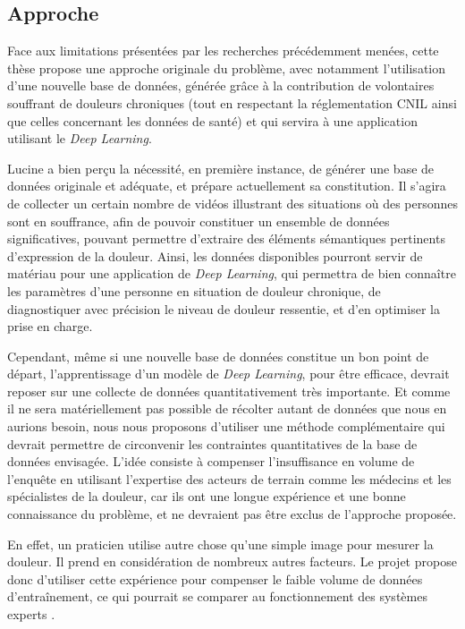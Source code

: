 \documentclass[french]{article}
\begin{document}
\subsection{Approche}
\label{sec:orgcad02fb}

Face aux limitations présentées par les recherches précédemment menées, cette
thèse propose une approche originale du problème, avec notamment l’utilisation
d’une nouvelle base de données, générée grâce à la contribution de volontaires
souffrant de douleurs chroniques (tout en respectant la réglementation CNIL
ainsi que celles concernant les données de santé) et qui servira à une
application utilisant le \emph{Deep Learning}.  

Lucine a bien perçu la nécessité, en première instance, de générer une base de
données originale et adéquate, et prépare actuellement sa constitution. Il
s’agira de collecter un certain nombre de vidéos illustrant des situations où
des personnes sont en souffrance, afin de pouvoir constituer un ensemble de
données significatives, pouvant permettre d’extraire des éléments sémantiques
pertinents d’expression de la douleur. Ainsi, les données disponibles pourront
servir de matériau pour une application de \emph{Deep Learning}, qui permettra de bien
connaître les paramètres d’une personne en situation de douleur chronique, de
diagnostiquer avec précision le niveau de douleur ressentie, et d’en optimiser
la prise en charge.

Cependant, même si une nouvelle base de données constitue un bon point de
départ, l’apprentissage d’un modèle de \emph{Deep Learning}, pour être efficace,
devrait reposer sur une collecte de données quantitativement très importante. Et
comme il ne sera matériellement pas possible de récolter autant de données que
nous en aurions besoin, nous nous proposons d’utiliser une méthode
complémentaire qui devrait permettre de circonvenir les contraintes
quantitatives de la base de données envisagée. L’idée consiste à compenser
l’insuffisance en volume de l’enquête en utilisant l’expertise des acteurs de
terrain comme les médecins et les spécialistes de la douleur, car ils ont une
longue expérience et une bonne connaissance du problème, et ne devraient pas
être exclus de l’approche proposée.  

En effet, un praticien utilise autre chose qu’une simple image pour mesurer la
douleur. Il prend en considération de nombreux autres facteurs. Le projet
propose donc d’utiliser cette expérience pour compenser le faible volume de
données d’entraînement, ce qui pourrait se comparer au fonctionnement des
systèmes experts \cite{giarratano1998expert}.  
\end{document}
